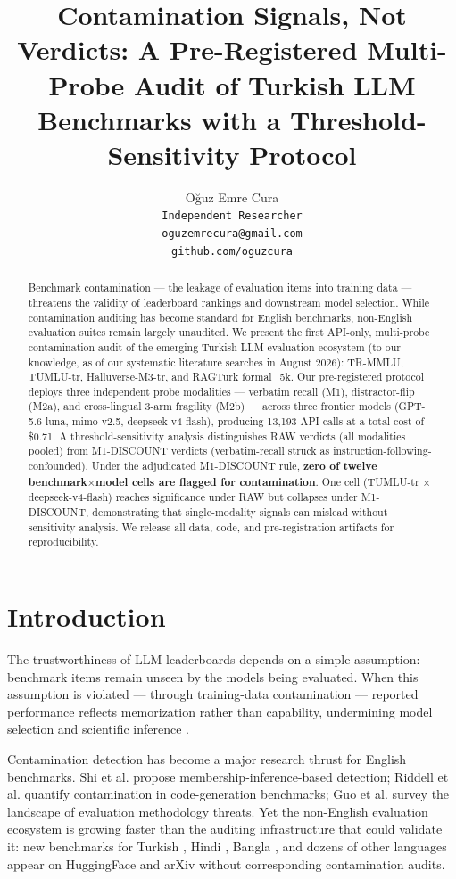 \documentclass[11pt]{article}
\title{Contamination Signals, Not Verdicts: A Pre-Registered Multi-Probe Audit of Turkish LLM Benchmarks with a Threshold-Sensitivity Protocol}
\author{
  O\u{g}uz Emre Cura\\
  \texttt{Independent Researcher}\\
  \texttt{oguzemrecura@gmail.com}\\
  \texttt{github.com/oguzcura}
}
\date{}
\begin{document}
\maketitle

\begin{abstract}
Benchmark contamination --- the leakage of evaluation items into training data --- threatens the validity of leaderboard rankings and downstream model selection. While contamination auditing has become standard for English benchmarks, non-English evaluation suites remain largely unaudited. We present the first API-only, multi-probe contamination audit of the emerging Turkish LLM evaluation ecosystem (to our knowledge, as of our systematic literature searches in August 2026): TR-MMLU, TUMLU-tr, Halluverse-M3-tr, and RAGTurk formal\_5k. Our pre-registered protocol deploys three independent probe modalities --- verbatim recall (M1), distractor-flip (M2a), and cross-lingual 3-arm fragility (M2b) --- across three frontier models (GPT-5.6-luna, mimo-v2.5, deepseek-v4-flash), producing 13,193 API calls at a total cost of \$0.71. A threshold-sensitivity analysis distinguishes RAW verdicts (all modalities pooled) from M1-DISCOUNT verdicts (verbatim-recall struck as instruction-following-confounded). Under the adjudicated M1-DISCOUNT rule, \textbf{zero of twelve benchmark$\times$model cells are flagged for contamination}. One cell (TUMLU-tr $\times$ deepseek-v4-flash) reaches significance under RAW but collapses under M1-DISCOUNT, demonstrating that single-modality signals can mislead without sensitivity analysis. We release all data, code, and pre-registration artifacts for reproducibility.
\end{abstract}

\section{Introduction}

The trustworthiness of LLM leaderboards depends on a simple assumption: benchmark items remain unseen by the models being evaluated. When this assumption is violated --- through training-data contamination --- reported performance reflects memorization rather than capability, undermining model selection and scientific inference \cite{yang2024data,liang2024survey,constat2024}.

Contamination detection has become a major research thrust for English benchmarks. Shi et al. \cite{geng2022detecting} propose membership-inference-based detection; Riddell et al. \cite{riddell2024code} quantify contamination in code-generation benchmarks; Guo et al. \cite{liang2024survey} survey the landscape of evaluation methodology threats. Yet the non-English evaluation ecosystem is growing faster than the auditing infrastructure that could validate it: new benchmarks for Turkish \cite{trmmu2024,tumlu2025}, Hindi \cite{indicmmlu2024}, Bangla \cite{mathshikkha2024}, and dozens of other languages appear on HuggingFace and arXiv without corresponding contamination audits.
\end{document}
